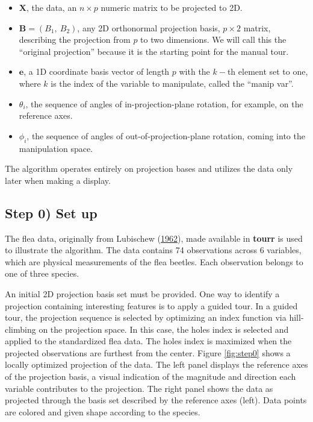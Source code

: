 \begin{itemize}
\tightlist
\item
  \(\textbf{X}\), the data, an \(n \times p\) numeric matrix to be
  projected to 2D.
\item
  \(\textbf{B} = (B_1,~ B_2)\), any 2D orthonormal projection basis,
  \(p \times 2\) matrix, describing the projection from \(p\) to two
  dimensions. We will call this the ``original projection'' because it
  is the starting point for the manual tour.
\item
  \(\textbf{e}\), a 1D coordinate basis vector of length \(p\) with the
  \(k-\)th element set to one, where \(k\) is the index of the variable
  to manipulate, called the ``manip var''.
\item
  \(\theta_i\), the sequence of angles of in-projection-plane rotation,
  for example, on the reference axes.
\item
  \(\phi_i\), the sequence of angles of out-of-projection-plane
  rotation, coming into the manipulation space.
\end{itemize}

The algorithm operates entirely on projection bases and utilizes the
data only later when making a display.

\hypertarget{step-0-set-up}{%
\subsection{Step 0) Set up}\label{step-0-set-up}}

The flea data, originally from Lubischew
(\protect\hyperlink{ref-lubischew_use_1962}{1962}), made available in
\textbf{tourr} is used to illustrate the algorithm. The data contains 74
observations across 6 variables, which are physical measurements of the
flea beetles. Each observation belongs to one of three species.

An initial 2D projection basis set must be provided. One way to identify
a projection containing interesting features is to apply a guided tour.
In a guided tour, the projection sequence is selected by optimizing an
index function via hill-climbing on the projection space. In this case,
the holes index is selected and applied to the standardized flea data.
The holes index is maximized when the projected observations are
furthest from the center. Figure \ref{fig:step0} shows a locally
optimized projection of the data. The left panel displays the reference
axes of the projection basis, a visual indication of the magnitude and
direction each variable contributes to the projection. The right panel
shows the data as projected through the basis set described by the
reference axes (left). Data points are colored and given shape according
to the species.

